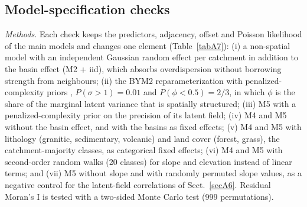 \documentclass[journal abbreviation, manuscript]{copernicus}
\begin{document}
\subsection{Model-specification checks}\label{secA7}

\textit{Methods.} Each check keeps the predictors, adjacency, offset and Poisson likelihood of the main models and changes one element (Table~\ref{tabA7}): (i) a non-spatial model with an independent Gaussian random effect per catchment in addition to the basin effect (M2 + iid), which absorbs overdispersion without borrowing strength from neighbours; (ii) the BYM2 reparameterization \citep{riebler2016intuitive} with penalized-complexity priors \citep{simpson2017penalising}, $P(\sigma > 1) = 0.01$ and $P(\phi < 0.5) = 2/3$, in which $\phi$ is the share of the marginal latent variance that is spatially structured; (iii) M5 with a penalized-complexity prior on the precision of its latent field; (iv) M4 and M5 without the basin effect, and with the basins as fixed effects; (v) M4 and M5 with lithology (granitic, sedimentary, volcanic) and land cover (forest, grass), the catchment-majority classes, as categorical fixed effects; (vi) M4 and M5 with second-order random walks (20 classes) for slope and elevation instead of linear terms; and (vii) M5 without slope and with randomly permuted slope values, as a negative control for the latent-field correlations of Sect.~\ref{secA6}. Residual Moran's I is tested with a two-sided Monte Carlo test (999 permutations).
\end{document}
